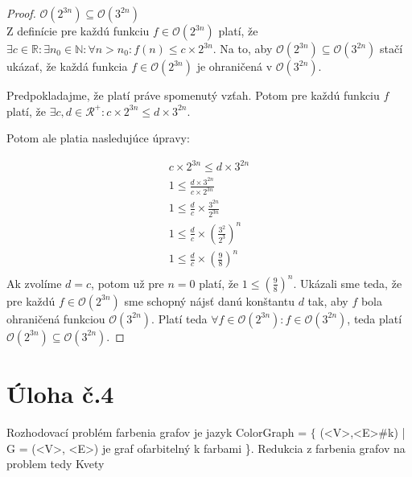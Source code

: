 \documentclass[10pt]{article}
\begin{document}
\begin{proof}
$\mathcal{O}(2^{3n}) \subseteq \mathcal{O}(3^{2n})$ \\
Z definície pre každú funkciu $f \in \mathcal{O}(2^{3n})$ platí, že $\exists c \in \mathbb{R}: \exists n_0 \in \mathbb{N}: \forall n > n_0: f(n) \leq c\times 2^{3n}$.  
Na to, aby $\mathcal{O}(2^{3n}) \subseteq \mathcal{O}(3^{2n})$ stačí ukázať, že každá funkcia $f \in \mathcal{O}(2^{3n})$ je ohraničená v $\mathcal{O}(3^{2n})$.

Predpokladajme, že platí práve spomenutý vzťah. Potom pre každú funkciu $f$ platí, že $\exists c,d \in \mathcal{R}^+: c \times 2^{3n} \leq d \times 3^{2n}$. 

Potom ale platia nasledujúce úpravy:

\begin{align*}
    c \times 2^{3n} \leq d \times 3^{2n}  \\
    1 \leq \frac{d \times 3^{2n}}{c \times 2^{3n}} \\
    1 \leq \frac{d}{c} \times \frac{3^{2n}}{2^{3n}} \\
    1 \leq \frac{d}{c} \times (\frac{3^{2}}{2^{3}})^n \\
    1 \leq \frac{d}{c} \times (\frac{9}{8})^n \\
\end{align*}
Ak zvolíme $d = c$, potom už pre $n = 0$ platí, že $1 \leq (\frac{9}{8})^n$.
Ukázali sme teda, že pre každú $f \in \mathcal{O}(2^{3n})$ sme schopný nájsť danú konštantu $d$ tak, aby $f$ bola ohraničená funkciou $\mathcal{O}(3^{2n})$.
Platí teda $\forall f \in \mathcal{O}(2^{3n}): f \in \mathcal{O}(3^{2n})$, teda platí $\mathcal{O}(2^{3n}) \subseteq \mathcal{O}(3^{2n})$. 
\end{proof}

\section*{Úloha č.4}
Rozhodovací problém farbenia grafov je jazyk ColorGraph = $\{$ (<V>,<E>\#k) | G = (<V>, <E>) je graf
ofarbitelný k farbami \}.
Redukcia z farbenia grafov na problem tedy Kvety 
\end{document}
